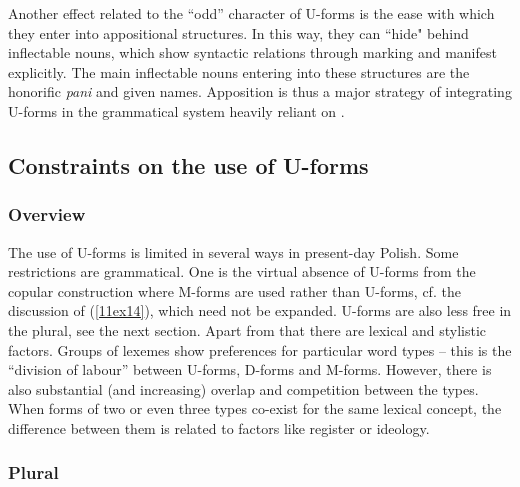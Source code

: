 \documentclass[output=paper,colorlinks,citecolor=brown]{langscibook}
\begin{document}
Another effect related to the ``odd'' character of U-forms is the ease with which they enter into appositional structures. In this way, they can ``hide" behind inflectable nouns, which show syntactic relations through  marking and manifest  explicitly. The main inflectable nouns entering into these structures are the honorific \emph{pani} and given names. Apposition is thus a major strategy of integrating U-forms in the grammatical system heavily reliant on .

\subsection{Constraints on the use of U-forms} \label{11sec3.3}

\subsubsection{Overview}

The use of U-forms is limited in several ways in present-day Polish. Some restrictions are grammatical. One is the virtual absence of U-forms from the copular construction where M-forms are used rather than U-forms, cf. the discussion of (\ref{11ex14}), which need not be expanded. U-forms are also less free in the plural, see the next section. Apart from that there are lexical and stylistic factors. Groups of lexemes show preferences for particular word types -- this is the ``division of labour'' between U-forms, D-forms and M-forms. However, there is also substantial (and increasing) overlap and competition between the types. When forms of two or even three types co-exist for the same lexical concept, the difference between them is related to factors like register or ideology.

\subsubsection{Plural } \label{11sec3.3.2}
\end{document}
